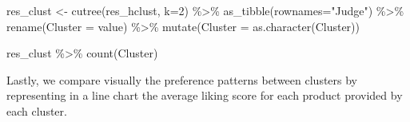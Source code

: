 \documentclass[
]{book}
\newenvironment{Shaded}{\begin{snugshade}}{\end{snugshade}}
\newcommand{\AttributeTok}[1]{\textcolor[rgb]{0.77,0.63,0.00}{#1}}
\newcommand{\DecValTok}[1]{\textcolor[rgb]{0.00,0.00,0.81}{#1}}
\newcommand{\FunctionTok}[1]{\textcolor[rgb]{0.00,0.00,0.00}{#1}}
\newcommand{\NormalTok}[1]{#1}
\newcommand{\OtherTok}[1]{\textcolor[rgb]{0.56,0.35,0.01}{#1}}
\newcommand{\SpecialCharTok}[1]{\textcolor[rgb]{0.00,0.00,0.00}{#1}}
\newcommand{\StringTok}[1]{\textcolor[rgb]{0.31,0.60,0.02}{#1}}
\begin{document}
\begin{Shaded}
\begin{Highlighting}[]
\NormalTok{res\_clust }\OtherTok{\textless{}{-}} \FunctionTok{cutree}\NormalTok{(res\_hclust, }\AttributeTok{k=}\DecValTok{2}\NormalTok{) }\SpecialCharTok{\%\textgreater{}\%} 
  \FunctionTok{as\_tibble}\NormalTok{(}\AttributeTok{rownames=}\StringTok{"Judge"}\NormalTok{) }\SpecialCharTok{\%\textgreater{}\%} 
  \FunctionTok{rename}\NormalTok{(}\AttributeTok{Cluster =}\NormalTok{ value) }\SpecialCharTok{\%\textgreater{}\%} 
  \FunctionTok{mutate}\NormalTok{(}\AttributeTok{Cluster =} \FunctionTok{as.character}\NormalTok{(Cluster))}

\NormalTok{res\_clust }\SpecialCharTok{\%\textgreater{}\%} 
  \FunctionTok{count}\NormalTok{(Cluster)}
\end{Highlighting}
\end{Shaded}

Lastly, we compare visually the preference patterns between clusters by representing in a line chart the average liking score for each product provided by each cluster.
\end{document}
